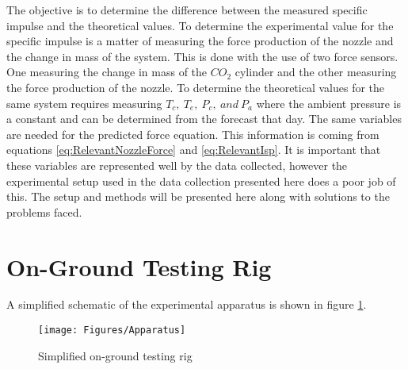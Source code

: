 The objective is to determine the difference between the measured specific impulse and the theoretical values. To determine the experimental value for the specific impulse is a matter of measuring the force production of the nozzle and the change in mass of the system. This is done with the use of two force sensors. One measuring the change in mass of the $CO_2$ cylinder and the other measuring the force production of the nozzle. To determine the theoretical values for the same system requires measuring $T_c,\ T_e,\ P_c,\ and\ P_a$ where the ambient pressure is a constant and can be determined from the forecast that day. The same variables are needed for the predicted force equation. This information is coming from equations \ref{eq:RelevantNozzleForce} and \ref{eq:RelevantIsp}. It is important that these variables are represented well by the data collected, however the experimental setup used in the data collection presented here does a poor job of this. The setup and methods will be presented here along with solutions to the problems faced. 
\section{On-Ground Testing Rig}
A simplified schematic of the experimental apparatus is shown in figure \ref{fig:ApparatusSchem}.
\begin{figure}[h!]
\centering
\texttt{[image: Figures/Apparatus]}
\caption{Simplified on-ground testing rig}
\label{fig:ApparatusSchem}
\end{figure}
